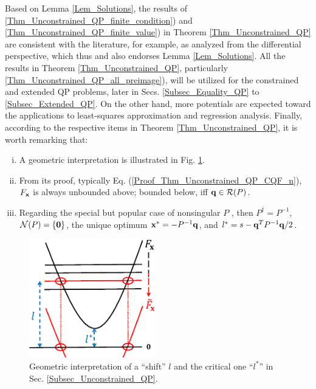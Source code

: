 \documentclass{imaman}
\newcommand{\bfx}{{\bf x}}
\newcommand{\bfq}{{\bf q}}
\newcommand{\bfzero}{{\bf 0}}
\newcommand{\calN}{{\mathcal N}}
\newcommand{\calR}{{\mathcal R}}
\numberwithin{equation}{section}
\begin{document}
\begin{remark}
Based on Lemma \ref{Lem_Solutions}, the results of \ref{Thm_Unconstrained_QP_finite_condition}) and \ref{Thm_Unconstrained_QP_finite_value}) in Theorem \ref{Thm_Unconstrained_QP} are consistent with the literature, for example, \cite{BoVa:04} as analyzed from the differential perspective, which thus and also endorses Lemma \ref{Lem_Solutions}. All the results in Theorem \ref{Thm_Unconstrained_QP}, particularly \ref{Thm_Unconstrained_QP_all_preimage}), will be utilized for the constrained and extended QP problems, later in Secs. \ref{Subsec_Equality_QP} to \ref{Subsec_Extended_QP}. On the other hand, more potentials are expected toward the applications to least-squares approximation and regression analysis. Finally, according to the respective items in Theorem \ref{Thm_Unconstrained_QP}, it is worth remarking that:
\begin{enumerate}[i)]
\item A geometric interpretation is illustrated in Fig. \ref{Fig_Shift}.
\item From its proof, typically Eq. (\ref{Proof_Thm_Unconstrained_QP_CQF_n}), $F_\bfx$ is always unbounded above; bounded below, iff $\bfq\in\calR(P)$.
\item Regarding the special but popular case of nonsingular $P$ \cite{Lu(Ye):03(16)}, then $P^\dagger=P^{-1}$, $\calN(P)=\{\bfzero\}$, the unique optimum $\bfx^*=-P^{-1}\bfq$, and $l^*=s-\bfq^TP^{-1}\bfq/2$.
\end{enumerate}
\label{Rem_Unconstrained_QP}
\end{remark}

\begin{figure}[htbp]
    \begin{center}
    \includegraphics[width=5.5cm]{Fig_Shift.eps}
    \caption{Geometric interpretation of a ``shift'' $l$ and the critical one ``$l^*$'' in Sec. {\rm\ref{Subsec_Unconstrained_QP}}.}
    \label{Fig_Shift}
    \end{center}
\end{figure}
\end{document}
